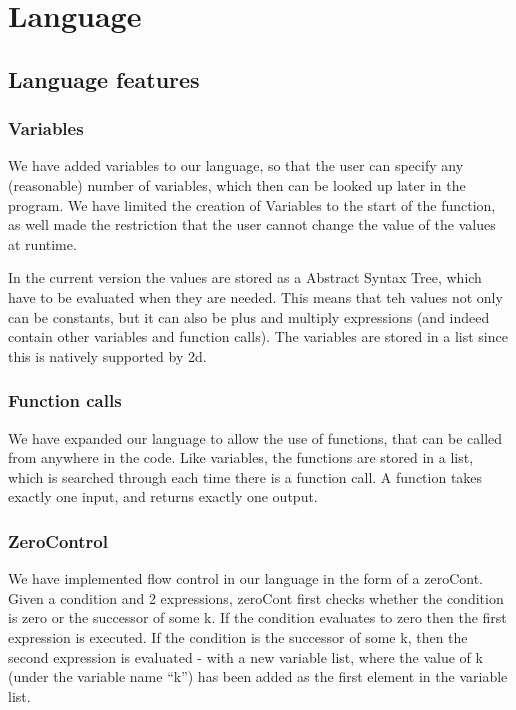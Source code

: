 \section{Language}


\subsection{Language features}
\subsubsection{Variables}
We have added variables to our language, so that the user can specify any (reasonable) number of variables, which then can be looked up later in the program. We have limited the creation of Variables to the start of the function, as well made the restriction that the user cannot change the value of the values at runtime.

In the current version the values are stored as a Abstract Syntax
Tree, which have to be evaluated when they are needed. This means that
teh values not only can be constants, but it can also be plus and
multiply expressions (and indeed contain other variables and function
calls). The variables are stored in a list since this is natively
supported by 2d.

\subsubsection{Function calls}

We have expanded our language to allow the use of functions, that can be called from anywhere in the code. Like variables, the functions are stored in a list, which is searched through each time there is a function call. A function takes exactly one input, and returns exactly one output.

\subsubsection{ZeroControl}
We have implemented flow control in our language in the form of a
zeroCont. Given a condition and 2 expressions, zeroCont first checks
whether the condition is zero or the successor of some k. If the
condition evaluates to zero then the first expression is executed. If
the condition is the successor of some k, then the second expression
is evaluated - with a new variable list, where the value of k (under the variable name ``k'') has been added as the first element in the variable list.

